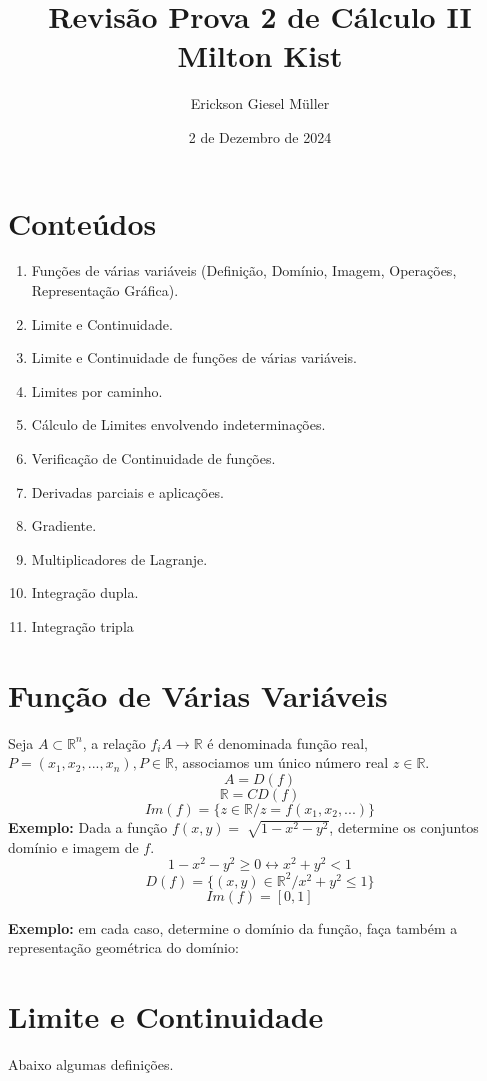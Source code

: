 \documentclass{article}
\title{Revisão Prova 2 de Cálculo II\\Milton Kist}
\author{Erickson Giesel Müller}
\date{2 de Dezembro de 2024}
\begin{document}
	\maketitle
	
	\section*{Conteúdos}
		\begin{enumerate}
			\item Funções de várias variáveis (Definição, Domínio, Imagem, Operações, Representação Gráfica).
			\item Limite e Continuidade.
			\item Limite e Continuidade de funções de várias variáveis.
			\item Limites por caminho.
			\item Cálculo de Limites envolvendo indeterminações.
			\item Verificação de Continuidade de funções.
			\item Derivadas parciais e aplicações.
			\item Gradiente.
			\item Multiplicadores de Lagranje.
			\item Integração dupla.
			\item Integração tripla
			
		\end{enumerate}
	\newpage
	
	\section{Função de Várias Variáveis}
		Seja $A\subset \mathbb{R}^n$, a relação $f_i A \to \mathbb{R}$ é denominada função real, $P=(x_1,x_2,...,x_n), P\in \mathbb{R}$, associamos um único número real $z \in \mathbb{R}$.
		$$A=D(f)$$
		$$\mathbb{R}=CD(f)$$
		$$Im(f)=\{z \in \mathbb{R}/z=f(x_1,x_2,...)\}$$
		\textbf{Exemplo:} Dada a função $f(x,y)=\sqrt[]{1-x^2-y^2}$, determine os conjuntos domínio e imagem de $f$.
		$$1-x^2-y^2 \geq 0 \leftrightarrow x^2+y^2 < 1$$
		$$D(f) = \{(x,y) \in \mathbb{R}^2/x^2+y^2\leq 1\}$$
		$$Im(f)=[0,1]$$
		
		\textbf{Exemplo:} em cada caso, determine o domínio da função, faça também a representação geométrica do domínio:
	\section{Limite e Continuidade}
	Abaixo algumas definições.
\end{document}
